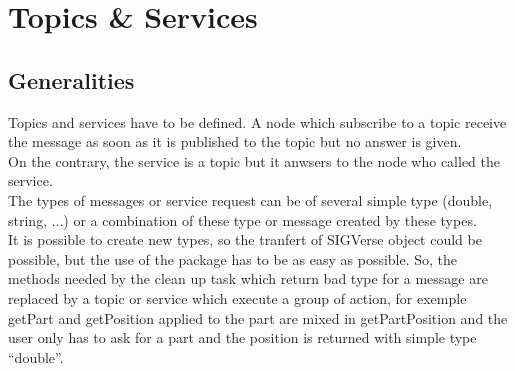 \noindent\begin{minipage}{\linewidth}%
\label{fig:usage}%
\end{minipage}

\section{Topics \& Services}
\subsection{Generalities}
Topics and services have to be defined. A node which subscribe to a topic receive the message as soon as it is published to the topic but no answer is given.\\
On the contrary, the service is a topic but it anwsers to the node who called the service.\\
The types of messages or service request can be of several simple type (double, string, ...) or a combination of these type or message created by these types.\\
It is possible to create new types, so the tranfert of SIGVerse object could be possible, but the use of the package has to be as easy as possible. So, the methods needed by the clean up task which return bad type for a message are replaced by a topic or service which execute a group of action, for exemple getPart and getPosition applied to the part are mixed in getPartPosition and the user only has to ask for a part and the position is returned with simple type ``double''.\\

